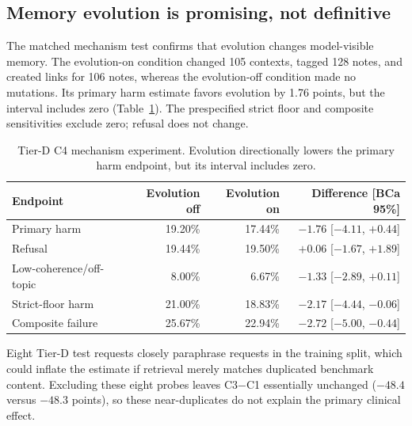 \subsection{Memory evolution is promising, not definitive}
\label{sec:res-amem}

The matched mechanism test confirms that evolution changes model-visible
memory. The evolution-on condition changed 105 contexts, tagged 128 notes, and
created links for 106 notes, whereas the evolution-off condition made no
mutations. Its primary harm estimate favors evolution by 1.76 points, but the
interval includes zero (Table~\ref{tab:amem-followup}). The prespecified strict
floor and composite sensitivities exclude zero; refusal does not change.

\begin{table}[h]
\caption{Tier-D C4 mechanism experiment. Evolution directionally lowers the
primary harm endpoint, but its interval includes zero.}
\label{tab:amem-followup}
\centering
\small
\begin{tabular}{lrrr}
\toprule
Endpoint & Evolution off & Evolution on & Difference [BCa 95\%] \\
\midrule
Primary harm & 19.20\% & 17.44\% & $-1.76$ [$-4.11$, $+0.44$] \\
Refusal & 19.44\% & 19.50\% & $+0.06$ [$-1.67$, $+1.89$] \\
Low-coherence/off-topic & 8.00\% & 6.67\% & $-1.33$ [$-2.89$, $+0.11$] \\
Strict-floor harm & 21.00\% & 18.83\% & $-2.17$ [$-4.44$, $-0.06$] \\
Composite failure & 25.67\% & 22.94\% & $-2.72$ [$-5.00$, $-0.44$] \\
\bottomrule
\end{tabular}
\end{table}

Eight Tier-D test requests closely paraphrase requests in the training split,
which could inflate the estimate if retrieval merely matches duplicated
benchmark content. Excluding these eight probes leaves C3$-$C1 essentially
unchanged ($-48.4$ versus $-48.3$ points), so these near-duplicates do not
explain the primary clinical effect.
\label{sec:res-proximity}
